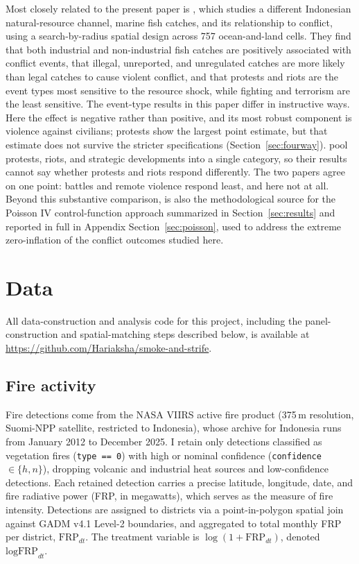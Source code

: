 \documentclass[12pt]{article}
\begin{document}
Most closely related to the present paper is \citet{lu2023fish}, which studies a different Indonesian natural-resource channel, marine fish catches, and its relationship to conflict, using a search-by-radius spatial design across 757 ocean-and-land cells. They find that both industrial and non-industrial fish catches are positively associated with conflict events, that illegal, unreported, and unregulated catches are more likely than legal catches to cause violent conflict, and that protests and riots are the event types most sensitive to the resource shock, while fighting and terrorism are the least sensitive. The event-type results in this paper differ in instructive ways. Here the effect is negative rather than positive, and its most robust component is violence against civilians; protests show the largest point estimate, but that estimate does not survive the stricter specifications (Section~\ref{sec:fourway}). \citet{lu2023fish} pool protests, riots, and strategic developments into a single category, so their results cannot say whether protests and riots respond differently. The two papers agree on one point: battles and remote violence respond least, and here not at all. Beyond this substantive comparison, \citet{lu2023fish} is also the methodological source for the Poisson IV control-function approach summarized in Section~\ref{sec:results} and reported in full in Appendix Section~\ref{sec:poisson}, used to address the extreme zero-inflation of the conflict outcomes studied here.

\section{Data}
\label{sec:data}

All data-construction and analysis code for this project, including the panel-construction and spatial-matching steps described below, is available at \url{https://github.com/Hariaksha/smoke-and-strife}.

\subsection{Fire activity}

Fire detections come from the NASA VIIRS active fire product (375\,m resolution, Suomi-NPP satellite, restricted to Indonesia), whose archive for Indonesia runs from January 2012 to December 2025. I retain only detections classified as vegetation fires (\texttt{type == 0}) with high or nominal confidence (\texttt{confidence} $\in \{h, n\}$), dropping volcanic and industrial heat sources and low-confidence detections. Each retained detection carries a precise latitude, longitude, date, and fire radiative power (FRP, in megawatts), which serves as the measure of fire intensity. Detections are assigned to districts via a point-in-polygon spatial join against GADM v4.1 Level-2 boundaries, and aggregated to total monthly FRP per district, $\text{FRP}_{dt}$. The treatment variable is $\log(1+\text{FRP}_{dt})$, denoted $\text{logFRP}_{dt}$.
\end{document}
